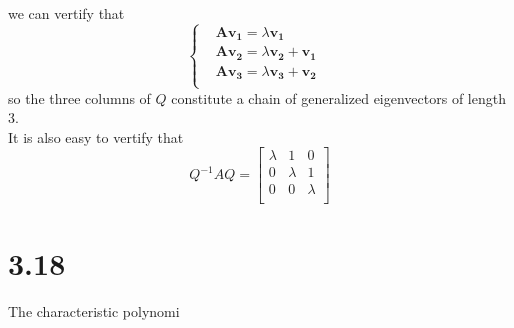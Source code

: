 \documentclass{article}
\begin{document}
we can vertify that 
\[
\left\{
\begin{aligned}
&\boldsymbol{Av_1}=\lambda\boldsymbol{v_1}&\\
&\boldsymbol{Av_2}=\lambda\boldsymbol{v_2}+\boldsymbol{v_1}&\\
&\boldsymbol{Av_3}=\lambda\boldsymbol{v_3}+\boldsymbol{v_2}&\\
\end{aligned}
\right.
\]
so the three columns of $Q$ constitute a chain of generalized eigenvectors of length 3.\\
It is also easy to vertify that 
\[Q^{-1}AQ=
\left[
\begin{array}{ccc}
\lambda & 1 & 0\\
0 & \lambda & 1\\
0 & 0 & \lambda\\
\end{array}
\right]
\]

\section*{3.18}
The characteristic polynomi
\end{document}
